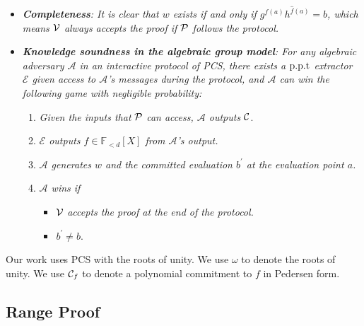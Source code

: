 \begin{itemize}
    \item \textit{\textbf{Completeness}: It is clear that $w$ exists if and only if $g^{f(a)}h^{\hat{f}(a)}=b$, which means $\mathcal{V}$ always accepts the proof if $\mathcal{P}$ follows the protocol.}
    \item \textit{\textbf{Knowledge soundness in the algebraic group model}: For any algebraic adversary $\mathcal{A}$ in an interactive protocol of PCS, there exists a $\text{p.p.t}$ extractor $\mathcal{E}$ given access to $\mathcal{A}$'s messages during the protocol, and $\mathcal{A}$ can win the following game with negligible probability:}
    \begin{enumerate}
        \item \textit{Given the inputs that} $\mathcal{P}$ \textit{can access, $\mathcal{A}$ outputs} $\mathcal{C}$.
        \item \textit{$\mathcal{E}$ outputs $f\in\mathbb{F}_{<d}[X]$ from $\mathcal{A}$'s output.}
        \item \textit{$\mathcal{A}$ generates $w$ and the committed evaluation $b^\prime$ at the evaluation point $a$.}
        \item \textit{$\mathcal{A}$ wins if}
        \begin{itemize}
            \item $\mathcal{V}$ \textit{accepts the proof at the end of the protocol.}
            \item $b^\prime\ne{b}$.
        \end{itemize}
    \end{enumerate}
\end{itemize}
Our work uses PCS with the roots of unity. We use $\omega$ to denote the roots of unity. We use $\mathcal{C}_f$ to denote a polynomial commitment to $f$ in Pedersen form.

\subsection{Range Proof}
\label{sec:range}

